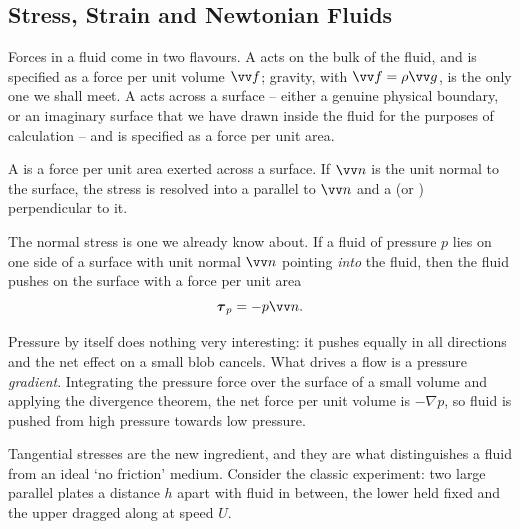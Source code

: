 \subsection{Stress, Strain and Newtonian Fluids}

Forces in a fluid come in two flavours. A  acts on the bulk of the fluid, and is specified as a force per unit volume $\vv f$; gravity, with $\vv f = \rho \vv g$, is the only one we shall meet. A  acts across a surface -- either a genuine physical boundary, or an imaginary surface that we have drawn inside the fluid for the purposes of calculation -- and is specified as a force per unit area.

\begin{definition}[Stress]
	A  is a force per unit area exerted across a surface. If $\vv n$ is the unit normal to the surface, the stress is resolved into a  parallel to $\vv n$ and a  (or )  perpendicular to it.
\end{definition}

The normal stress is one we already know about. If a fluid of pressure $p$ lies on one side of a surface with unit normal $\vv n$ pointing \emph{into} the fluid, then the fluid pushes on the surface with a force per unit area
$$
\boldsymbol\tau_p = - p \vv n.
$$

\begin{center}
\end{center}

Pressure by itself does nothing very interesting: it pushes equally in all directions and the net effect on a small blob cancels. What drives a flow is a pressure \emph{gradient}. Integrating the pressure force over the surface of a small volume and applying the divergence theorem, the net force per unit volume is $-\nabla p$, so fluid is pushed from high pressure towards low pressure.

Tangential stresses are the new ingredient, and they are what distinguishes a fluid from an ideal `no friction' medium. Consider the classic experiment: two large parallel plates a distance $h$ apart with fluid in between, the lower held fixed and the upper dragged along at speed $U$.

